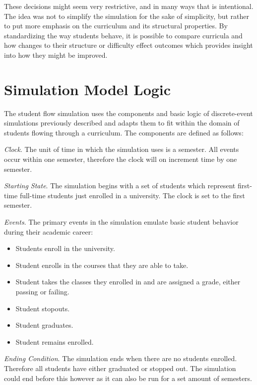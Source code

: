 \documentclass[botnum, fleqn]{unmeethesis}
\begin{document}
    These decisions might seem very restrictive, and in many ways that is intentional. The idea was not to simplify the simulation for the sake of simplicity, but rather to put more emphasis on the curriculum and its structural properties. By standardizing the way students behave, it is possible to compare curricula and how changes to their structure or difficulty effect outcomes which provides insight into how they might be improved.

  \section{Simulation Model Logic}
    The student flow simulation uses the components and basic logic of discrete-event simulations previously described and adapts them to fit within the domain of students flowing through a curriculum. The components are defined as follows:

    \textit{Clock}. The unit of time in which the simulation uses is a semester. All events occur within one semester, therefore the clock will on increment time by one semester.

    \textit{Starting State}. The simulation begins with a set of students which represent first-time full-time students just enrolled in a university. The clock is set to the first semester.

    \textit{Events}. The primary events in the simulation emulate basic student behavior during their academic career:
    \begin{itemize}
      \item Students enroll in the university.
      \item Student enrolls in the courses that they are able to take.
      \item Student takes the classes they enrolled in and are assigned a grade, either passing or failing.
      \item Student stopouts.
      \item Student graduates.
      \item Student remains enrolled.
    \end{itemize}

    \textit{Ending Condition}. The simulation ends when there are no students enrolled. Therefore all students have either graduated or stopped out. The simulation could end before this however as it can also be run for a set amount of semesters.

\end{document}
